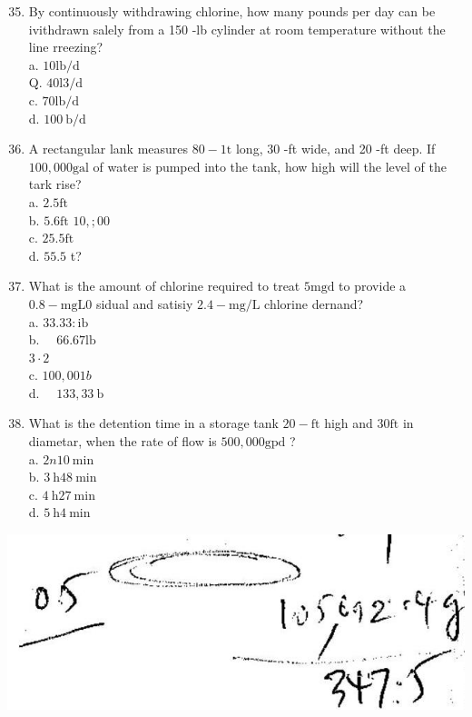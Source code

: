 \documentclass[10pt]{article}
\begin{document}
\begin{enumerate}
  \setcounter{enumi}{34}
  \item By continuously withdrawing chlorine, how many pounds per day can be ivithdrawn salely from a 150 -lb cylinder at room temperature without the line rreezing?\\
a. $10 \mathrm{lb} / \mathrm{d}$\\
Q. $40 \mathrm{l} 3 / \mathrm{d}$\\
c. $70 \mathrm{lb} / \mathrm{d}$\\
d. $100 \mathrm{~b} / \mathrm{d}$

  \item A rectangular lank measures $80-1 \mathrm{t}$ long, 30 -ft wide, and 20 -ft deep. If $100,000 \mathrm{gal}$ of water is pumped into the tank, how high will the level of the tark rise?\\
a. $2.5 \mathrm{ft}$\\
b. $5.6 \mathrm{ft}$ $10, ; 00$\\
c. $25.5 \mathrm{ft}$\\
d. $55.5$ t?

  \item What is the amount of chlorine required to treat $5 \mathrm{mgd}$ to provide a $0.8-\mathrm{mg} \mathrm{L} 0$ sidual and satisiy $2.4-\mathrm{mg} / \mathrm{L}$ chlorine dernand?\\
a. $33.33: \mathrm{ib}$\\
b. $\quad 66.67 \mathrm{lb}$\\
$3 \cdot 2$\\
c. $100,001 b$\\
d. $\quad 133,33 \mathrm{~b}$

  \item What is the detention time in a storage tank $20-\mathrm{ft}$ high and $30 \mathrm{ft}$ in diametar, when the rate of flow is $500,000 \mathrm{gpd}$ ?\\
a. $2 n 10 \mathrm{~min}$\\
b. $3 \mathrm{~h} 48 \mathrm{~min}$\\
c. $4 \mathrm{~h} 27 \mathrm{~min}$\\
d. $5 \mathrm{~h} 4 \mathrm{~min}$

\end{enumerate}

\includegraphics[max width=\textwidth]{2022_11_11_ca6a6c1a0324ee23e523g-16(1)}
\end{document}
